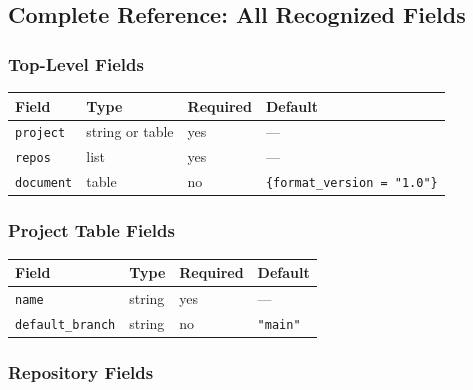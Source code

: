 \subsection{Complete Reference: All Recognized Fields}
\label{subsec:cgs-fields}

\subsubsection{Top-Level Fields}

\begin{center}
\begin{tabular}{llll}
\textbf{Field} & \textbf{Type} & \textbf{Required} & \textbf{Default} \\ \hline
\texttt{project} & string or table & yes & — \\
\texttt{repos} & list & yes & — \\
\texttt{document} & table & no & \texttt{\{format\_version = "1.0"\}} \\
\end{tabular}
\end{center}

\subsubsection{Project Table Fields}

\begin{center}
\begin{tabular}{llll}
\textbf{Field} & \textbf{Type} & \textbf{Required} & \textbf{Default} \\ \hline
\texttt{name} & string & yes & — \\
\texttt{default\_branch} & string & no & \texttt{"main"} \\
\end{tabular}
\end{center}

\subsubsection{Repository Fields}

